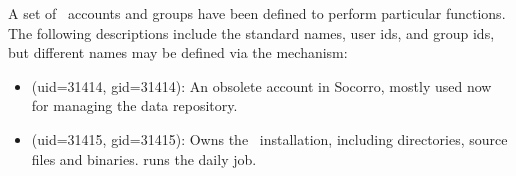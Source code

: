 A set of \casa\ accounts and groups have been defined to perform particular
functions.  The following descriptions include the standard names, user ids,
and group ids, but different names may be defined via the 
mechanism:

\begin{itemize}
\item
     (uid=31414, gid=31414): An obsolete account in Socorro,
    mostly used now for managing the data repository.

\item
     (uid=31415, gid=31415): Owns the \casa\ installation,
    including directories, source files and binaries.  
     runs the daily
      job.

\end{itemize}

